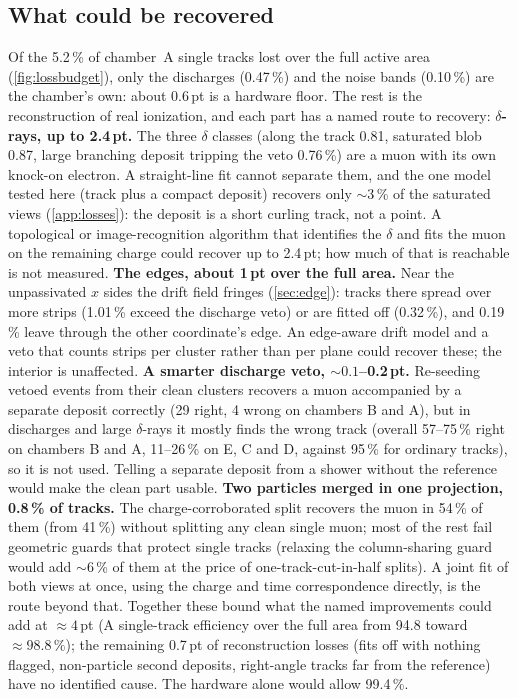 \subsection{What could be recovered}\label{sec:improve}
Of the 5.2\,\% of chamber~A single tracks lost over the full active area (\cref{fig:lossbudget}), only the discharges
(0.47\,\%) and the noise bands (0.10\,\%) are the chamber's own: about 0.6\,pt is a hardware floor. The rest is the
reconstruction of real ionization, and each part has a named route to recovery:
\textbf{$\delta$-rays, up to 2.4\,pt.} The three $\delta$ classes (along the track 0.81, saturated blob 0.87, large
branching deposit tripping the veto 0.76\,\%) are a muon with its own knock-on electron. A straight-line fit cannot
separate them, and the one model tested here (track plus a compact deposit) recovers only ${\sim}3$\,\% of the saturated
views (\cref{app:losses}): the deposit is a short curling track, not a point. A topological or image-recognition
algorithm that identifies the $\delta$ and fits the muon on the remaining charge could recover up to 2.4\,pt; how much
of that is reachable is not measured.
\textbf{The edges, about 1\,pt over the full area.} Near the unpassivated $x$ sides the drift field fringes
(\cref{sec:edge}): tracks there spread over more strips (1.01\,\% exceed the discharge veto) or are fitted off (0.32\,\%), and
0.19\,\% leave through the other coordinate's edge. An edge-aware drift model and a veto that counts strips per cluster
rather than per plane could recover these; the interior is unaffected.
\textbf{A smarter discharge veto, ${\sim}0.1$--0.2\,pt.} Re-seeding vetoed events from their clean clusters recovers a
muon accompanied by a separate deposit correctly (29 right, 4 wrong on chambers B and A), but in discharges and large
$\delta$-rays it mostly finds the wrong track (overall 57--75\,\% right on chambers B and A, 11--26\,\% on E, C and D, against
95\,\% for ordinary tracks), so it is not used. Telling a separate deposit from a shower without the reference would
make the clean part usable.
\textbf{Two particles merged in one projection, 0.8\,\% of tracks.} The charge-corroborated split recovers the muon
in 54\,\% of them (from 41\,\%) without splitting any clean single muon; most of the rest fail geometric guards that
protect single tracks (relaxing the column-sharing guard would add ${\sim}6$\,\% of them at the price of
one-track-cut-in-half splits). A joint fit of both views at once, using the charge and time correspondence directly,
is the route beyond that.
Together these bound what the named improvements could add at ${\approx}4$\,pt (A single-track efficiency over the
full area from 94.8 toward ${\approx}98.8\,\%$); the remaining 0.7\,pt of reconstruction losses (fits off with nothing
flagged, non-particle second deposits, right-angle tracks far from the reference) have no identified cause. The hardware alone
would allow 99.4\,\%.

